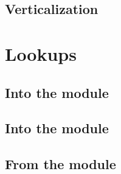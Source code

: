 \subsection{Verticalization}                         \label{log info: constraints: verticalization}        

\section{Lookups}                                    \label{log info: lookups}
\subsection{Into the \rlpTxnRcptMod{} module}            \label{log info: lookups: txn rlp}                    
\subsection{Into the \logDataMod{} module}            \label{log info: lookups: log data}                    
\subsection{From the \hubMod{} module}               \label{log info: lookups: batch data}                 

